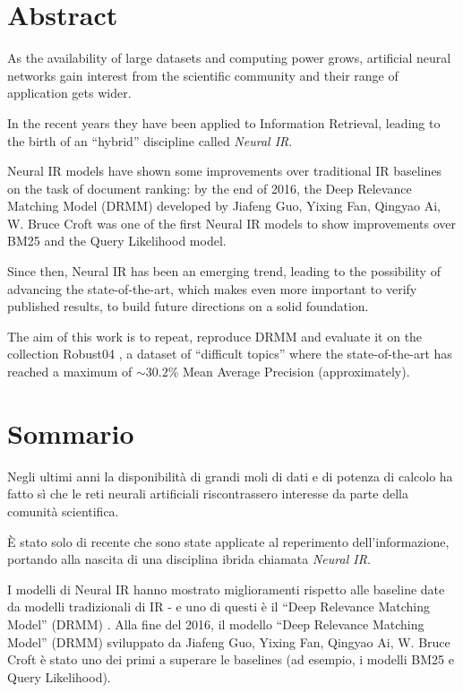 \cleardoublepage
{}
\section*{Abstract}
\thispagestyle{empty}

As the availability of large datasets and computing power grows, artificial neural networks gain interest from the scientific community and their range of application gets wider.

In the recent years they have been applied to Information Retrieval, leading to the birth of an ``hybrid'' discipline called \textit{Neural IR}.

Neural IR models have shown some improvements over traditional IR baselines on the task of document ranking: by the end of 2016, the Deep Relevance Matching Model (DRMM) \cite{drmm} developed by Jiafeng Guo, Yixing Fan, Qingyao Ai, W. Bruce Croft was one of the first Neural IR models to show improvements over BM25 and the Query Likelihood model.

Since then, Neural IR has been an emerging trend, leading to the possibility of advancing the state-of-the-art, which makes even more important to verify published results, to build future directions on a solid foundation.

The aim of this work is to repeat, reproduce DRMM and evaluate it on the collection Robust04 \cite{rob04}, a dataset of ``difficult topics'' where the state-of-the-art has reached a maximum of $ \sim 30.2\%$ Mean Average Precision (approximately).

\bigskip

\cleardoublepage
\section*{Sommario}
\thispagestyle{empty}

Negli ultimi anni la disponibilità di grandi moli di dati e di potenza di calcolo ha fatto sì che le reti neurali artificiali riscontrassero interesse da parte della comunità scientifica.

È stato solo di recente che sono state applicate al reperimento dell'informazione, portando alla nascita di una disciplina ibrida chiamata \textit{Neural IR}.

I modelli di Neural IR hanno mostrato miglioramenti rispetto alle baseline date da modelli tradizionali di IR - e uno di questi è il ``Deep Relevance Matching Model'' (DRMM) \cite{drmm}. Alla fine del 2016, il modello ``Deep Relevance Matching Model'' (DRMM) sviluppato da  Jiafeng Guo, Yixing Fan, Qingyao Ai, W. Bruce Croft è stato uno dei primi a superare le baselines (ad esempio, i modelli BM25 e Query Likelihood).


